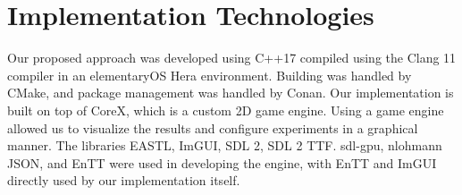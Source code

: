 
\section{Implementation Technologies}
Our proposed approach was developed using C++17 compiled using the Clang 11 compiler in an elementaryOS Hera environment. Building was handled by CMake, and package management was handled by Conan. Our implementation is built on top of CoreX, which is a custom 2D game engine. Using a game engine allowed us to visualize the results and configure experiments in a graphical manner. The libraries EASTL, ImGUI, SDL 2, SDL 2 TTF. sdl-gpu, nlohmann JSON, and EnTT were used in developing the engine, with EnTT and ImGUI directly used by our implementation itself.